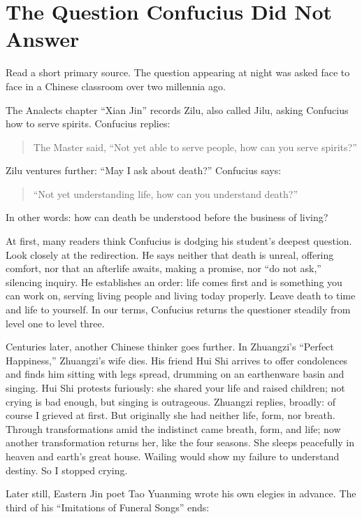 \section{The Question Confucius Did Not Answer}
Read a short primary source. The question appearing at night was asked face to face in a Chinese classroom over two millennia ago.

The Analects chapter ``Xian Jin'' records Zilu, also called Jilu, asking Confucius how to serve spirits. Confucius replies:

\begin{quote}
The Master said, ``Not yet able to serve people, how can you serve spirits?''
\end{quote}
Zilu ventures further: ``May I ask about death?'' Confucius says:

\begin{quote}
``Not yet understanding life, how can you understand death?''
\end{quote}
In other words: how can death be understood before the business of living?

At first, many readers think Confucius is dodging his student's deepest question. Look closely at the redirection. He says neither that death is unreal, offering comfort, nor that an afterlife awaits, making a promise, nor ``do not ask,'' silencing inquiry. He establishes an order: life comes first and is something you can work on, serving living people and living today properly. Leave death to time and life to yourself. In our terms, Confucius returns the questioner steadily from level one to level three.

Centuries later, another Chinese thinker goes further. In Zhuangzi's ``Perfect Happiness,'' Zhuangzi's wife dies. His friend Hui Shi arrives to offer condolences and finds him sitting with legs spread, drumming on an earthenware basin and singing. Hui Shi protests furiously: she shared your life and raised children; not crying is bad enough, but singing is outrageous. Zhuangzi replies, broadly: of course I grieved at first. But originally she had neither life, form, nor breath. Through transformations amid the indistinct came breath, form, and life; now another transformation returns her, like the four seasons. She sleeps peacefully in heaven and earth's great house. Wailing would show my failure to understand destiny. So I stopped crying.

Later still, Eastern Jin poet Tao Yuanming wrote his own elegies in advance. The third of his ``Imitations of Funeral Songs'' ends:

